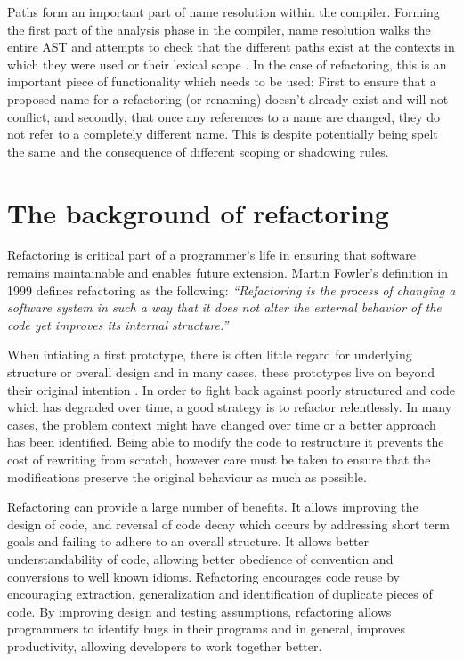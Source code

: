 Paths form an important part of name resolution within the compiler. Forming the first part of the analysis phase in the compiler, name resolution walks the entire AST and attempts to check that the different paths exist at the contexts in which they were used or their lexical scope \cite{driver15}. In the case of refactoring, this is an important piece of functionality which needs to be used: First to ensure that a proposed name for a refactoring (or renaming) doesn't already exist and will not conflict, and secondly, that once any references to a name are changed, they do not refer to a completely different name. This is despite potentially being spelt the same and the consequence of different scoping or shadowing rules.

\section{The background of refactoring}\label{S:refactorback}
Refactoring is critical part of a programmer's life in ensuring that software remains maintainable and enables future extension. Martin Fowler's definition in 1999 \cite{fowler99} defines refactoring as the following: \emph{``Refactoring is the process of changing a software system in such a way that it does not alter the external behavior of the code yet improves its internal structure.''}

When intiating a first prototype, there is often little regard for underlying structure or overall design and in many cases, these prototypes live on beyond their original intention \cite{foote1997big}. In order to fight back against poorly structured and code which has degraded over time, a good strategy is to refactor relentlessly. In many cases, the problem context might have changed over time or a better approach has been identified. Being able to modify the code to restructure it prevents the cost of rewriting from scratch, however care must be taken to ensure that the modifications preserve the original behaviour as much as possible.

Refactoring can provide a large number of benefits. It allows improving the design of code, and reversal of code decay which occurs by addressing short term goals and failing to adhere to an overall structure. It allows better understandability of code, allowing better obedience of convention and conversions to well known idioms. Refactoring encourages code reuse by encouraging extraction, generalization and identification of duplicate pieces of code. By improving design and testing assumptions, refactoring allows programmers to identify bugs in their programs and in general, improves productivity, allowing developers to work together better.

